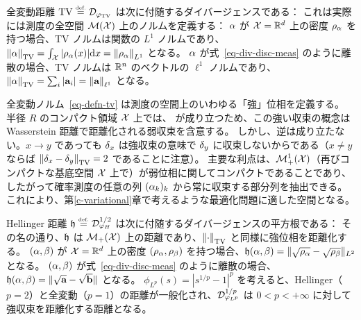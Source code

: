 \begin{example}[全変動]\label{exmp-tv}
全変動距離 $\operatorname{TV} \stackrel{\mbox{\upshape\tiny def.}}{=} \mathcal{D}_{\varphi_{\operatorname{TV}}}$ は次に付随するダイバージェンスである：
これは実際には測度の全空間 $\mathcal{M}(\mathcal{X})$ 上のノルムを定義する：
$\alpha$ が $\mathcal{X}=\mathbb{R}^d$ 上の密度 $\rho_{\alpha}$ を持つ場合、TV ノルムは関数の $L^1$ ノルムであり、$\left\| \alpha \right\|_{\operatorname{TV}} = \int_{\mathcal{X}} |\rho_{\alpha}(x)| \mathrm{d} x = \left\| \rho_{\alpha} \right\|_{L^1}$ となる。
%
$\alpha$ が式~\eqref{eq-div-disc-meas} のように離散の場合、TV ノルムは $\mathbb{R}^n$ のベクトルの $\ell^1$ ノルムであり、$\left\| \alpha \right\|_{\operatorname{TV}}=\sum_i |\mathrm{\textbf{a}}_i| = \left\| \mathrm{\textbf{a}} \right\|_{\ell^1}$ となる。
\end{example}

\begin{rem}[強位相と弱位相]
	全変動ノルム~\eqref{eq-defn-tv} は測度の空間上のいわゆる「強」位相を定義する。
	半径 $R$ のコンパクト領域 $\mathcal{X}$ 上では、
	が成り立つため、この強い収束の概念は Wasserstein 距離で距離化される弱収束を含意する。
	しかし、逆は成り立たない。$x \rightarrow y$ であっても $\delta_x$ は強収束の意味で $\delta_y$ に収束しないからである（$x \neq y$ ならば $\left\| \delta_x-\delta_y \right\|_{\operatorname{TV}}=2$ であることに注意）。
	主要な利点は、$\mathcal{M}_+^1(\mathcal{X})$（再びコンパクトな基底空間 $\mathcal{X}$ 上で）が弱位相に関してコンパクトであることであり、したがって確率測度の任意の列 $(\alpha_k)_k$ から常に収束する部分列を抽出できる。これにより、第\ref{c-variational}章で考えるような最適化問題に適した空間となる。
\end{rem}


\begin{example}[Hellinger]\label{exmp-hellinger}
	Hellinger 距離 $\mathfrak{h} \stackrel{\mbox{\upshape\tiny def.}}{=} \mathcal{D}_{\varphi_{H}}^{1/2}$ は次に付随するダイバージェンスの平方根である：
	その名の通り、$\mathfrak{h}$ は $\mathcal{M}_+(\mathcal{X})$ 上の距離であり、$\left\| \cdot \right\|_{\operatorname{TV}}$ と同様に強位相を距離化する。
	$(\alpha,\beta)$ が $\mathcal{X}=\mathbb{R}^d$ 上の密度 $(\rho_{\alpha},\rho_{\beta})$ を持つ場合、$\mathfrak{h}(\alpha,\beta) = \| \sqrt{\rho_{\alpha}}-\sqrt{\rho_{\beta}} \|_{L^2}$ となる。
	$(\alpha,\beta)$ が式~\eqref{eq-div-disc-meas} のように離散の場合、$\mathfrak{h}(\alpha,\beta) = \| \sqrt{\mathrm{\textbf{a}}}-\sqrt{\mathrm{\textbf{b}}} \|$ となる。
	$\phi_{L^p}(s)=|s^{1/p}-1|^p$ を考えると、Hellinger（$p=2$）と全変動（$p=1$）の距離が一般化され、$\mathcal{D}_{\varphi_{L^p}}^{1/p}$ は $0<p<+\infty$ に対して強収束を距離化する距離となる。
\end{example}


